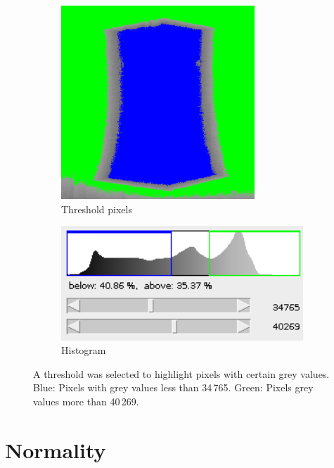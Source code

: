 \documentclass[12pt]{report}
\begin{document}
\begin{figure}[p]
	\centering
	\begin{subfigure}[b]{0.45\textwidth}
		\centering
		\includegraphics[width=0.8\textwidth]{figures/block_threshold.png}
		\caption{Threshold pixels}
	\end{subfigure}
	\begin{subfigure}[b]{0.45\textwidth}
		\centering
		\includegraphics[width=1\textwidth]{figures/block_threshold_histogram.png}
		\caption{Histogram}	
	\end{subfigure}
	\caption{A threshold was selected to highlight pixels with certain grey values. Blue: Pixels with grey values less than 34\,765. Green: Pixels grey values more than 40\,269.}
	\label{fig:block_threshold}
\end{figure}

\section{Normality}
\end{document}
